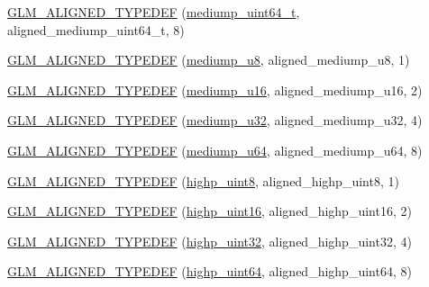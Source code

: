 \begin{DoxyCompactItemize}
\hyperlink{group__gtx__type__aligned_gad14a0f2ec93519682b73d70b8e401d81}{G\+L\+M\+\_\+\+A\+L\+I\+G\+N\+E\+D\+\_\+\+T\+Y\+P\+E\+D\+E\+F} (\hyperlink{group__gtc__type__precision_gaa97354d3120a6dc029a5e9563723de18}{mediump\+\_\+uint64\+\_\+t}, aligned\+\_\+mediump\+\_\+uint64\+\_\+t, 8)
\item 
\hyperlink{group__gtx__type__aligned_gada8b996eb6526dc1ead813bd49539d1b}{G\+L\+M\+\_\+\+A\+L\+I\+G\+N\+E\+D\+\_\+\+T\+Y\+P\+E\+D\+E\+F} (\hyperlink{group__gtc__type__precision_gac04b372784392e82bd557f300c4de097}{mediump\+\_\+u8}, aligned\+\_\+mediump\+\_\+u8, 1)
\item 
\hyperlink{group__gtx__type__aligned_ga28948f6bfb52b42deb9d73ae1ea8d8b0}{G\+L\+M\+\_\+\+A\+L\+I\+G\+N\+E\+D\+\_\+\+T\+Y\+P\+E\+D\+E\+F} (\hyperlink{group__gtc__type__precision_ga6745262ef6a6fdb8637b2387ef924828}{mediump\+\_\+u16}, aligned\+\_\+mediump\+\_\+u16, 2)
\item 
\hyperlink{group__gtx__type__aligned_gad6a7c0b5630f89d3f1c5b4ef2919bb4c}{G\+L\+M\+\_\+\+A\+L\+I\+G\+N\+E\+D\+\_\+\+T\+Y\+P\+E\+D\+E\+F} (\hyperlink{group__gtc__type__precision_gad0c27a525045c299a92306eb4cd7c13a}{mediump\+\_\+u32}, aligned\+\_\+mediump\+\_\+u32, 4)
\item 
\hyperlink{group__gtx__type__aligned_gaa0fc531cbaa972ac3a0b86d21ef4a7fa}{G\+L\+M\+\_\+\+A\+L\+I\+G\+N\+E\+D\+\_\+\+T\+Y\+P\+E\+D\+E\+F} (\hyperlink{group__gtc__type__precision_ga00c51a16fa190b0a90205d50d6d8a44a}{mediump\+\_\+u64}, aligned\+\_\+mediump\+\_\+u64, 8)
\item 
\hyperlink{group__gtx__type__aligned_ga0ee829f7b754b262bbfe6317c0d678ac}{G\+L\+M\+\_\+\+A\+L\+I\+G\+N\+E\+D\+\_\+\+T\+Y\+P\+E\+D\+E\+F} (\hyperlink{group__gtc__type__precision_ga2c27c6dd26e893786f04b10f99c1ee95}{highp\+\_\+uint8}, aligned\+\_\+highp\+\_\+uint8, 1)
\item 
\hyperlink{group__gtx__type__aligned_ga447848a817a626cae08cedc9778b331c}{G\+L\+M\+\_\+\+A\+L\+I\+G\+N\+E\+D\+\_\+\+T\+Y\+P\+E\+D\+E\+F} (\hyperlink{group__gtc__type__precision_ga4d32967d45ba8365e2a05eaaac85e978}{highp\+\_\+uint16}, aligned\+\_\+highp\+\_\+uint16, 2)
\item 
\hyperlink{group__gtx__type__aligned_ga6027ae13b2734f542a6e7beee11b8820}{G\+L\+M\+\_\+\+A\+L\+I\+G\+N\+E\+D\+\_\+\+T\+Y\+P\+E\+D\+E\+F} (\hyperlink{group__gtc__type__precision_ga3145e44c73e2df7dfe4f3cb65974bf22}{highp\+\_\+uint32}, aligned\+\_\+highp\+\_\+uint32, 4)
\item 
\hyperlink{group__gtx__type__aligned_ga2aca46c8608c95ef991ee4c332acde5f}{G\+L\+M\+\_\+\+A\+L\+I\+G\+N\+E\+D\+\_\+\+T\+Y\+P\+E\+D\+E\+F} (\hyperlink{group__gtc__type__precision_ga8079c653e20cda03d34b99de629a7b09}{highp\+\_\+uint64}, aligned\+\_\+highp\+\_\+uint64, 8)

\end{DoxyCompactItemize}
